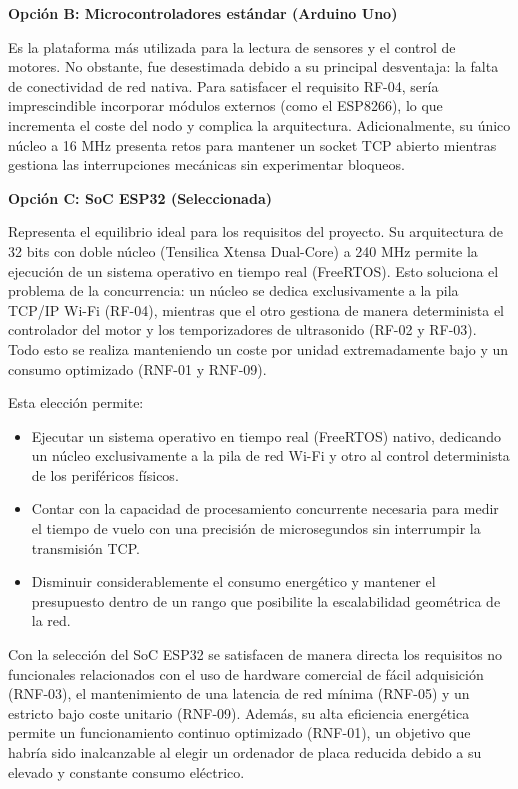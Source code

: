 \textbf{Opción B: Microcontroladores estándar (Arduino Uno)}

Es la plataforma más utilizada para la lectura de sensores y el control de motores. No obstante, fue desestimada debido a su principal desventaja: la falta de conectividad de red nativa. Para satisfacer el requisito RF-04, sería imprescindible incorporar módulos externos (como el ESP8266), lo que incrementa el coste del nodo y complica la arquitectura. Adicionalmente, su único núcleo a 16 MHz presenta retos para mantener un socket TCP abierto mientras gestiona las interrupciones mecánicas sin experimentar bloqueos.

\textbf{Opción C: SoC ESP32 (Seleccionada)}

Representa el equilibrio ideal para los requisitos del proyecto. Su arquitectura de 32 bits con doble núcleo (Tensilica Xtensa Dual-Core) a 240 MHz permite la ejecución de un sistema operativo en tiempo real (FreeRTOS). Esto soluciona el problema de la concurrencia: un núcleo se dedica exclusivamente a la pila TCP/IP Wi-Fi (RF-04), mientras que el otro gestiona de manera determinista el controlador del motor y los temporizadores de ultrasonido (RF-02 y RF-03). Todo esto se realiza manteniendo un coste por unidad extremadamente bajo y un consumo optimizado (RNF-01 y RNF-09).

Esta elección permite:
\begin{itemize}
    \item Ejecutar un sistema operativo en tiempo real (FreeRTOS) nativo, dedicando un núcleo exclusivamente a la pila de red Wi-Fi y otro al control determinista de los periféricos físicos.
    \item Contar con la capacidad de procesamiento concurrente necesaria para medir el tiempo de vuelo con una precisión de microsegundos sin interrumpir la transmisión TCP.
    \item Disminuir considerablemente el consumo energético y mantener el presupuesto dentro de un rango que posibilite la escalabilidad geométrica de la red.
\end{itemize}

Con la selección del SoC ESP32 se satisfacen de manera directa los requisitos no funcionales relacionados con el uso de hardware comercial de fácil adquisición (RNF-03), el mantenimiento de una latencia de red mínima (RNF-05) y un estricto bajo coste unitario (RNF-09). Además, su alta eficiencia energética permite un funcionamiento continuo optimizado (RNF-01), un objetivo que habría sido inalcanzable al elegir un ordenador de placa reducida debido a su elevado y constante consumo eléctrico.

